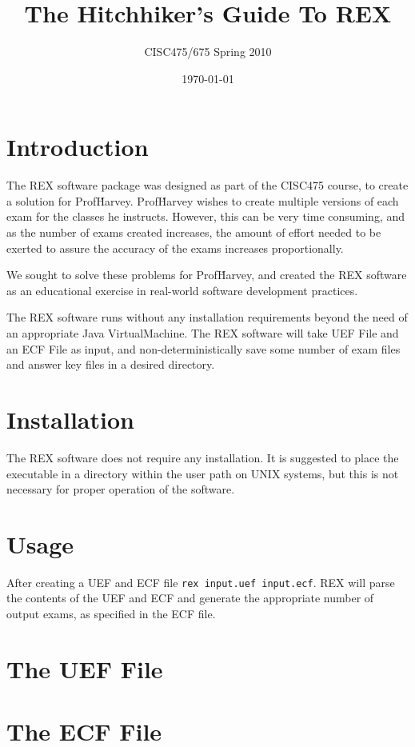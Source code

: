 \documentclass{article}
\author{CISC475/675 Spring 2010}
\title{The Hitchhiker's Guide To REX}
\date{\today}
\begin{document}
\maketitle
\tableofcontents
\newpage

\section{Introduction}
The REX software package was designed as part of the CISC475 course,
to create a solution for Prof\. Harvey. Prof\. Harvey wishes to create
multiple versions of each exam for the classes he instructs. However,
this can be very time consuming, and as the number of exams created
increases, the amount of effort needed to be exerted to assure the
accuracy of the exams increases proportionally.

We sought to solve these problems for Prof\. Harvey, and created the
REX software as an educational exercise in real-world software
development practices.

The REX software runs without any installation requirements beyond the
need of an appropriate Java VirtualMachine. The REX software will take
UEF File and an ECF File as input, and non-deterministically save
some number of exam files and answer key files in a desired directory.

\section{Installation}
The REX software does not require any installation. It is suggested to
place the  executable in a directory within the user
path on UNIX systems, but this is not necessary for proper operation
of the software.

\section{Usage}
After creating a UEF and ECF file \texttt{rex input.uef input.ecf}. 
REX will parse the contents of the UEF and ECF and generate the appropriate number of
output exams, as specified in the ECF file.

\section{The UEF File}

\section{The ECF File}
\end{document}
